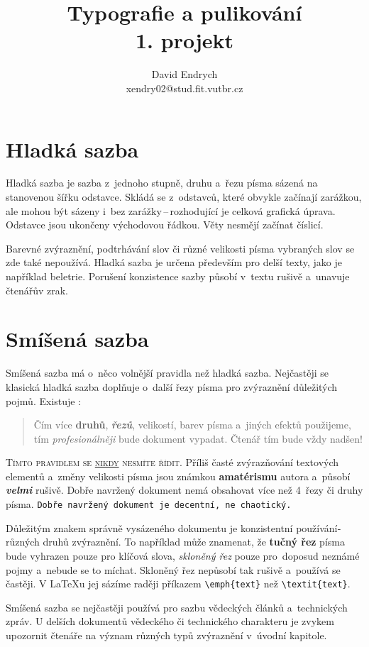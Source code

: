 \documentclass[a4paper,twocolumn,11pt]{article}
\title{Typografie a pulikování\\1. projekt}
\author{David Endrych\\xendry02@stud.fit.vutbr.cz}
\date{}
\begin{document}
\maketitle

\section{Hladká sazba}

Hladká sazba je sazba z~jednoho stupně, druhu a~řezu pí­sma sázená na stanovenou šířku odstavce. Skládá se z~odstavců, které obvykle začínají­ zarážkou, ale mohou být sázeny i~bez zarážky\,--\,rozhodují­cí­ je celková grafická úprava. Odstavce jsou ukončeny východovou řádkou. Věty nesmějí začínat číslicí.
\par Barevné zvýraznění­, podtrhávání­ slov či různé velikosti písma vybraných slov se zde také nepoužívá. Hladká sazba je určena především pro delší­ texty, jako je napří­klad beletrie. Porušení­ konzistence sazby působí v~textu rušivě a~unavuje čtenářův zrak.

\section{Smíšená sazba}  

Smíšená sazba má o~něco volnější­ pravidla než hladká sazba. Nejčastěji se klasická hladká sazba doplňuje o~další řezy pí­sma pro zvýraznění­ důležitých pojmů. Existuje :
\begin{quotation}
Čí­m ví­ce \textbf{druhů}, \textit{\textbf{řezů}}, {\scriptsize velikostí}, barev pí­sma a~jiných efektů použijeme, tí­m \emph{profesionálněji} bude  dokument vypadat. Čtenář tím bude vždy {\Huge nadšen!}
\end{quotation}
\textsc{Tí­mto pravidlem se \underline{nikdy} nesmí­te ří­dit.} Příliš časté zvýrazňování textových elementů  a~změny velikosti {\tiny pí­sma} jsou {\LARGE známkou} {\huge \textbf{amatérismu}} autora a~působí \textbf{\emph{velmi}} rušivě. Dobře navržený dokument nemá obsahovat ví­ce než 4~řezy či druhy pí­sma. \texttt{Dobře navržený dokument je decentní­, ne chaotický.} 
\par Důležitým znakem správně vysázeného dokumentu je konzistentní použí­vání­ různých druhů zvýraznění­. To napří­klad může znamenat, že \textbf{tučný řez} pí­sma bude vyhrazen pouze pro klíčová slova, \emph{skloněný řez} pouze pro~doposud neznámé pojmy a~nebude se to míchat. Skloněný řez nepůsobí­ tak rušivě a~použí­vá se častěji. V \LaTeX u jej sází­me raději pří­kazem \verb|\emph{text}| než \verb|\textit{text}|.
\par Smíšená sazba se nejčastěji používá pro sazbu vědeckých článků a~technických zpráv. U delší­ch dokumentů vědeckého či technického charakteru je zvykem upozornit čtenáře na význam různých typů zvýraznění­ v~úvodní­ kapitole.
\end{document}
